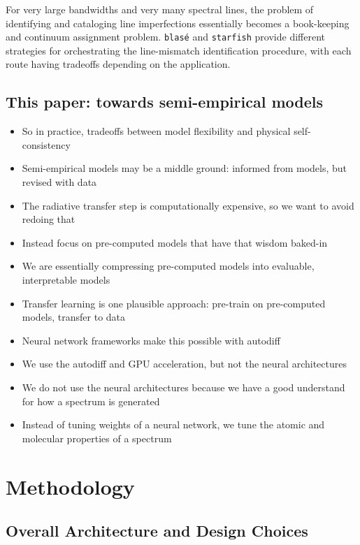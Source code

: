 \documentclass[modern]{aastex631}
\begin{document}
For very large bandwidths and very many spectral lines, the problem of identifying and cataloging line imperfections essentially becomes a book-keeping and continuum assignment problem.  \texttt{blas\'e} and \texttt{starfish} provide different strategies for orchestrating the line-mismatch identification procedure, with each route having tradeoffs depending on the application.  


\subsection{This paper: towards semi-empirical models}
\begin{itemize}
 \item So in practice, tradeoffs between model flexibility and physical self-consistency
 \item Semi-empirical models may be a middle ground: informed from models, but revised with data
 \item The radiative transfer step is computationally expensive, so we want to avoid redoing that
 \item Instead focus on pre-computed models that have that wisdom baked-in
 \item We are essentially compressing pre-computed models into evaluable, interpretable models
 \item Transfer learning is one plausible approach: pre-train on pre-computed models, transfer to data
 \item Neural network frameworks make this possible with autodiff
 \item We use the autodiff and GPU acceleration, but not the neural architectures
 \item We do not use the neural architectures because we have a good understand for how a spectrum is generated
 \item Instead of tuning weights of a neural network, we tune the atomic and molecular properties of a spectrum
\end{itemize}


\section{Methodology}

\subsection{Overall Architecture and Design Choices}
\end{document}
